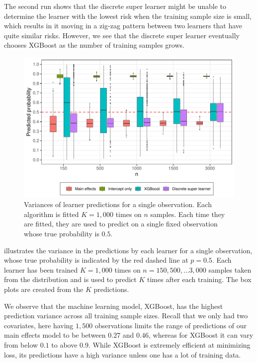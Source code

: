 \documentclass[./main.tex]{subfiles}
\begin{document}
The second run shows that the discrete super learner might be unable to determine the learner with the lowest risk when the training sample size is small, which results in it moving in a zig-zag pattern between two learners that have quite similar risks. However, we see that the discrete super learner eventually chooses XGBoost as the number of training samples grows.  

\begin{figure}[H]
    \centering
    \includegraphics[width=\textwidth]{figures/learner_vars_1000.pdf}
    \caption{Variances of learner predictions for a single observation. Each algorithm is fitted $ K = 1,000 $ times on $n$ samples. Each time they are fitted, they are used to predict on a single fixed observation whose true probability is $ 0.5 $.}
    \label{fig:pred_probs_boxplot}
\end{figure}
 illustrates the variance in the predictions by each learner for a single observation, whose true probability is indicated by the red dashed line at $ p = 0.5 $. Each learner has been trained $ K = 1,000 $ times on $ n = 150, 500, \dots 3,000 $ samples taken from the distribution and is used to predict $ K $ times after each training. The box plots are created from the $ K $ predictions. 

We observe that the machine learning model, XGBoost, has the highest prediction variance across all training sample sizes. Recall that we only had two covariates, here having $ 1,500 $ observations limits the range of predictions of our main effects model to be between $ 0.27 $ and $ 0.46 $, whereas for XGBoost it can vary from below $ 0.1 $ to above $ 0.9 $. While XGBoost is extremely efficient at minimizing loss, its predictions have a high variance unless one has a lot of training data.
\end{document}
